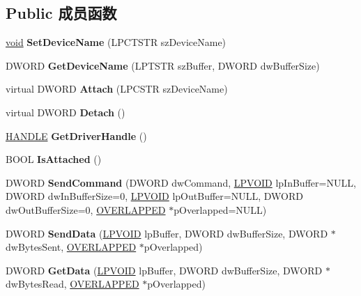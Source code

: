 \subsection*{Public 成员函数}
\begin{DoxyCompactItemize}
\item 
\mbox{\label{class_c_b_t_h_w_adb1ca333a68121fc62e3ffb43a3bf9a0}} 
\hyperlink{interfacevoid}{void} {\bfseries Set\+Device\+Name} (L\+P\+C\+T\+S\+TR sz\+Device\+Name)
\item 
\mbox{\label{class_c_b_t_h_w_a8dadd2a80cfdee3485cad58d72c30543}} 
D\+W\+O\+RD {\bfseries Get\+Device\+Name} (L\+P\+T\+S\+TR sz\+Buffer, D\+W\+O\+RD dw\+Buffer\+Size)
\item 
\mbox{\label{class_c_b_t_h_w_a2e7b71f73d8278915273342b1ffc14f6}} 
virtual D\+W\+O\+RD {\bfseries Attach} (L\+P\+C\+S\+TR sz\+Device\+Name)
\item 
\mbox{\label{class_c_b_t_h_w_ac6a1cff7456ce0d63bf99784a4a9037a}} 
virtual D\+W\+O\+RD {\bfseries Detach} ()
\item 
\mbox{\label{class_c_b_t_h_w_ae218d630a0bcc2b9787a3bee55723ee2}} 
\hyperlink{interfacevoid}{H\+A\+N\+D\+LE} {\bfseries Get\+Driver\+Handle} ()
\item 
\mbox{\label{class_c_b_t_h_w_a934d54b0da4d78e25a29cae19a7f4840}} 
B\+O\+OL {\bfseries Is\+Attached} ()
\item 
\mbox{\label{class_c_b_t_h_w_a6d681ab7ada6c25dd6288ce8d8238268}} 
D\+W\+O\+RD {\bfseries Send\+Command} (D\+W\+O\+RD dw\+Command, \hyperlink{interfacevoid}{L\+P\+V\+O\+ID} lp\+In\+Buffer=N\+U\+LL, D\+W\+O\+RD dw\+In\+Buffer\+Size=0, \hyperlink{interfacevoid}{L\+P\+V\+O\+ID} lp\+Out\+Buffer=N\+U\+LL, D\+W\+O\+RD dw\+Out\+Buffer\+Size=0, \hyperlink{struct___o_v_e_r_l_a_p_p_e_d}{O\+V\+E\+R\+L\+A\+P\+P\+ED} $\ast$p\+Overlapped=N\+U\+LL)
\item 
\mbox{\label{class_c_b_t_h_w_a24bbe15de4639201030e8e46ed9960f6}} 
D\+W\+O\+RD {\bfseries Send\+Data} (\hyperlink{interfacevoid}{L\+P\+V\+O\+ID} lp\+Buffer, D\+W\+O\+RD dw\+Buffer\+Size, D\+W\+O\+RD $\ast$dw\+Bytes\+Sent, \hyperlink{struct___o_v_e_r_l_a_p_p_e_d}{O\+V\+E\+R\+L\+A\+P\+P\+ED} $\ast$p\+Overlapped)
\item 
\mbox{\label{class_c_b_t_h_w_ac96d713aeda5dfa9f2ed6dea8ad67d67}} 
D\+W\+O\+RD {\bfseries Get\+Data} (\hyperlink{interfacevoid}{L\+P\+V\+O\+ID} lp\+Buffer, D\+W\+O\+RD dw\+Buffer\+Size, D\+W\+O\+RD $\ast$dw\+Bytes\+Read, \hyperlink{struct___o_v_e_r_l_a_p_p_e_d}{O\+V\+E\+R\+L\+A\+P\+P\+ED} $\ast$p\+Overlapped)
\end{DoxyCompactItemize}
